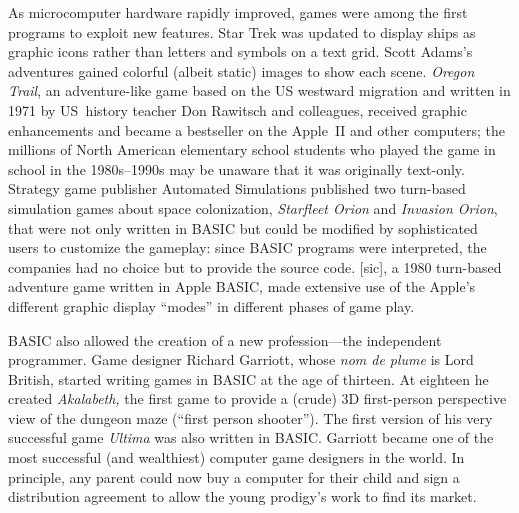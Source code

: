 As microcomputer hardware rapidly improved,
games were among the first programs to exploit new features.
Star Trek was updated to display ships as graphic icons rather than
letters and symbols on a text grid.
Scott Adams's adventures gained colorful (albeit static) images to
show each scene.
\emph{Oregon Trail}, an adventure-like game based on the US westward
migration and written in 1971 by US~history teacher Don Rawitsch and colleagues,
received graphic enhancements and became
a bestseller on the Apple~II and other computers;
the millions of
North American elementary school students who played the game in school
in the 1980s--1990s
may be unaware that it was originally text-only.
Strategy game publisher
Automated Simulations published two turn-based simulation games about
space colonization,
\emph{Starfleet Orion} and \emph{Invasion Orion}, that were not only
written in BASIC but could be modified by sophisticated users to
customize the gameplay: since BASIC programs were interpreted, the
companies had no choice but to provide the source code.
 [sic], a 1980 turn-based adventure game
written in Apple BASIC,
made extensive use of the Apple's different graphic display ``modes''
in different phases of game play.


BASIC also allowed the creation of a new profession---the independent
programmer.
Game designer Richard Garriott, whose \emph{nom de plume} is Lord
British, started writing games in BASIC at the age of thirteen.
At eighteen he created
\emph{Akalabeth,} the first game to provide a (crude) 3D first-person
perspective view of the dungeon maze (``first person shooter'').
The first version of his very
successful game \emph{Ultima} was also written in BASIC.
Garriott became one of the most successful (and wealthiest)
computer game designers in the world.
In principle, any parent could now buy a computer for their child and
sign a distribution agreement to allow the young prodigy's work to
find its market.

